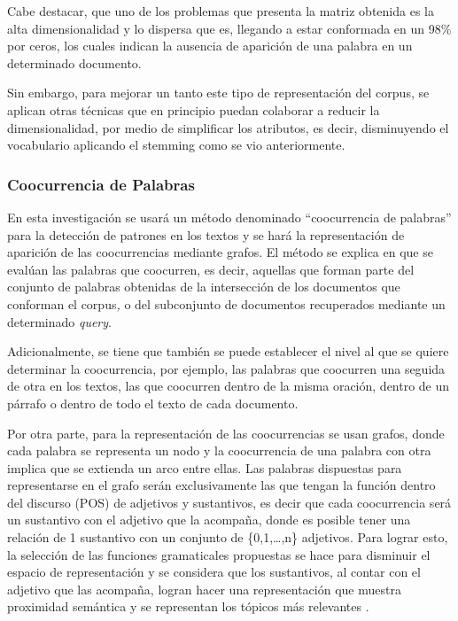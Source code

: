 \documentclass[
  12pt,
  openany]{book}
\begin{document}
Cabe destacar, que uno de los problemas que presenta la matriz obtenida es la alta dimensionalidad y lo dispersa que es, llegando a estar conformada en un 98\% por ceros, los cuales indican la ausencia de aparición de una palabra en un determinado documento.

Sin embargo, para mejorar un tanto este tipo de representación del corpus, se aplican otras técnicas que en principio puedan colaborar a reducir la dimensionalidad, por medio de simplificar los atributos, es decir, disminuyendo el vocabulario aplicando el stemming como se vio anteriormente.

\hypertarget{coocurrencia}{%
\subsubsection{Coocurrencia de Palabras}\label{coocurrencia}}

En esta investigación se usará un método denominado ``coocurrencia de palabras'' para la detección de patrones en los textos y se hará la representación de aparición de las coocurrencias mediante grafos. El método se explica en que se evalúan las palabras que coocurren, es decir, aquellas que forman parte del conjunto de palabras obtenidas de la intersección de los documentos que conforman el corpus\emph{,} o del subconjunto de documentos recuperados mediante un determinado \emph{query}.

Adicionalmente, se tiene que también se puede establecer el nivel al que se quiere determinar la coocurrencia, por ejemplo, las palabras que coocurren una seguida de otra en los textos, las que coocurren dentro de la misma oración, dentro de un párrafo o dentro de todo el texto de cada documento.

Por otra parte, para la representación de las coocurrencias se usan grafos, donde cada palabra se representa un nodo y la coocurrencia de una palabra con otra implica que se extienda un arco entre ellas. Las palabras dispuestas para representarse en el grafo serán exclusivamente las que tengan la función dentro del discurso (POS) de adjetivos y sustantivos, es decir que cada coocurrencia será un sustantivo con el adjetivo que la acompaña, donde es posible tener una relación de 1 sustantivo con un conjunto de \{0,1,\ldots,n\} adjetivos. Para lograr esto, la selección de las funciones gramaticales propuestas se hace para disminuir el espacio de representación y se considera que los sustantivos, al contar con el adjetivo que las acompaña, logran hacer una representación que muestra proximidad semántica y se representan los tópicos más relevantes \citep{segev2021}.
\end{document}
